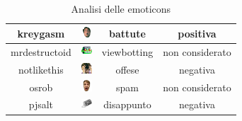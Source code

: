 \documentclass[a4paper,12pt,openright,twoside]{report}
\theoremstyle{definition}
\begin{document}
\begin{table}[H]
\begin{center}
\begin{tabular}{|c|c|c|c|}
\hline
kreygasm & \includegraphics[height=0.4cm, width=0.4cm]{Immagini/Emoticons/kreygasm} & battute & positiva \\
\hline
mrdestructoid & \includegraphics[height=0.4cm, width=0.4cm]{Immagini/Emoticons/mrdestructoid.png} & viewbotting & non considerato \\
\hline
notlikethis & \includegraphics[height=0.4cm, width=0.4cm]{Immagini/Emoticons/notlike.png} & offese & negativa \\
\hline
osrob & \includegraphics[height=0.4cm, width=0.4cm]{Immagini/Emoticons/osrob.png} & spam & non considerato \\
\hline
pjsalt & \includegraphics[height=0.4cm, width=0.4cm]{Immagini/Emoticons/pjsalt.png} & disappunto & negativa \\
\hline
\end{tabular}
\end{center}
\caption{Analisi delle emoticons}
\label{tab:emoticons1}
\end{table}
\end{document}
